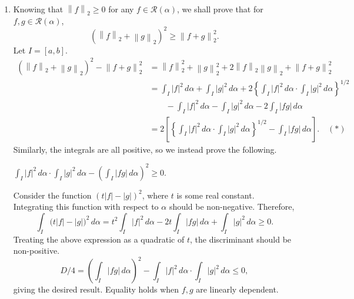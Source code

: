 \documentclass[12pt]{report}
\newcommand{\numl}[1]{\item[\large\textbf{\sffamily #1.}]}
\newcommand{\ds}{\displaystyle}
\newcommand{\mc}[1]{\mathcal{#1}}
\newcommand{\norm}[1]{\left\lVert #1 \right\rVert}
\newcommand{\abs}[1]{\left| #1 \right|}
\renewcommand{\d}[1]{\,d{#1}}
\begin{document}
\begin{enumerate}
    \numl{5} Knowing that \(\norm{f}_2 \geq 0\) for any \(f \in \mc{R}(\alpha)\), we shall prove that for \(f, g \in \mc{R}(\alpha)\),
    \[ \tag{\(\star\)}
        \left(\norm{f}_2 + \norm{g}_2\right)^2 \geq \norm{f+g}_2^2.
    \]
    Let \(I = [a, b]\).
    \[
        \begin{aligned}
            \left(\norm{f}_2 + \norm{g}_2\right)^2 - \norm{f+g}_2^2 & = \norm{f}_2^2 + \norm{g}_2^2 + 2\norm{f}_2\norm{g}_2 + \norm{f+g}_2^2                                                                                                                                      \\
                                                                    & =                                                          \int_I \abs{f}^2 \d{\alpha} + \int_I \abs{g}^2 \d{\alpha} + 2 \left\{\int_I \abs{f}^2 \d{\alpha} \cdot \int_I \abs{g}^2 \d{\alpha}\right\}^{1/2} \\
                                                                    & \qquad - \int_I \abs{f}^2 \d{\alpha} - \int_I \abs{g}^2 \d{\alpha} - 2 \int_I \abs{fg} \d{\alpha}                                                                                                           \\
                                                                    & =                                                         2\left[\left\{\int_I \abs{f}^2 \d{\alpha} \cdot \int_I \abs{g}^2 \d{\alpha}\right\}^{1/2} - \int_I \abs{fg} \d{\alpha}\right]. \quad (\ast)
        \end{aligned}
    \]
    Similarly, the integrals are all positive, so we instead prove the following.

    \medskip

     \(\ds \int_I \abs{f}^2 \d{\alpha} \cdot \int_I \abs{g}^2 \d{\alpha} - \left(\int_I \abs{fg} \d{\alpha}\right)^2 \geq 0\).

     Consider the function \((t\abs{f} - \abs{g})^2\), where \(t\) is some real constant. Integrating this function with respect to \(\alpha\) should be non-negative. Therefore,
    \[
        \int_I \bigl(t\abs{f} - \abs{g}\bigr)^2 \d{\alpha} = t^2 \int_I \abs{f}^2 \d{\alpha} - 2t \int_I \abs{fg}\d{\alpha} + \int_I \abs{g}^2\d{\alpha} \geq 0.
    \]
    Treating the above expression as a quadratic of \(t\), the discriminant should be non-positive.
    \[
        D/4 = \left(\int_I \abs{fg} \d{\alpha}\right)^2 - \int_I \abs{f}^2 \d{\alpha} \cdot \int_I \abs{g}^2 \d{\alpha} \leq 0,
    \]
    giving the desired result. Equality holds when \(f, g\) are linearly dependent.


\end{enumerate}
\end{document}
